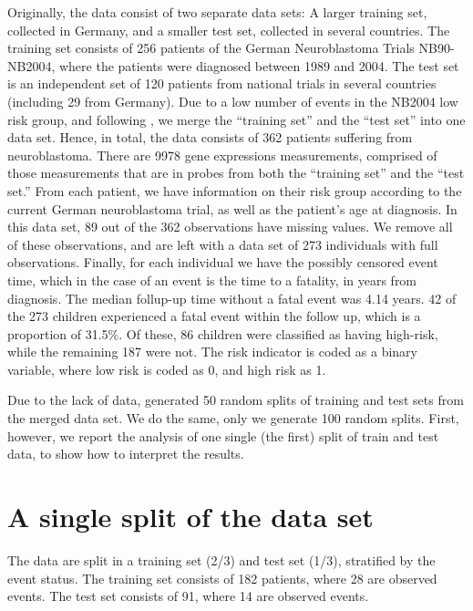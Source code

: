 Originally, the data consist of two separate data sets:
A larger training set, collected in Germany, and a smaller test set, collected in several countries.
The training set consists of 256 patients of the German Neuroblastoma Trials NB90-NB2004, where the patients were diagnosed between 1989 and 2004.
The test set is an independent set of 120 patients from national trials in several countries (including 29 from Germany).
Due to a low number of events in the NB2004 low risk group, and following \citet{bovelstad2009}, we merge the ``training set'' and the ``test set'' into one data set.
Hence, in total, the data consists of 362 patients suffering from neuroblastoma.
There are 9978 gene expressions measurements, comprised of those measurements that are in probes from both the ``training set'' and the ``test set.''
From each patient, we have information on their risk group according to the current German neuroblastoma trial, as well as the patient's age at diagnosis.
In this data set, 89 out of the 362 observations have missing values.
We remove all of these observations, and are left with a data set of 273 individuals with full observations.
Finally, for each individual we have the possibly censored event time, which in the case of an event is the time to a fatality, in years from diagnosis.
The median follup-up time without a fatal event was 4.14 years.
42 of the 273 children experienced a fatal event within the follow up, which is a proportion of 31.5\%.
Of these, 86 children were classified as having high-risk, while the remaining 187 were not.
The risk indicator is coded as a binary variable, where low risk is coded as 0, and high risk as 1.

Due to the lack of data, \citet{bovelstad2009} generated 50 random splits of training and test sets from the merged data set.
We do the same, only we generate 100 random splits.
First, however, we report the analysis of one single (the first) split of train and test data, to show how to interpret the results.

\section{A single split of the data set}
The data are split in a training set (2/3) and test set (1/3), stratified by the event status.
The training set consists of 182 patients, where 28 are observed events.
The test set consists of 91, where 14 are observed events.

